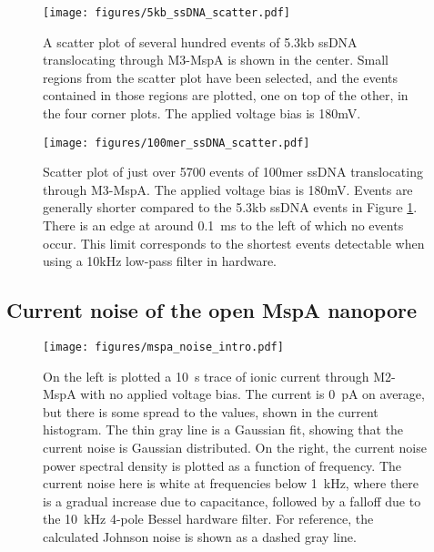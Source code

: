 \begin{figure}[h]
\begin{centering}
\texttt{[image: figures/5kb\_ssDNA\_scatter.pdf]}
\caption[Scatter plot of 5.3kb ssDNA in MspA]{A scatter plot of several hundred events of 5.3kb ssDNA translocating through M3-MspA is shown in the center.  Small regions from the scatter plot have been selected, and the events contained in those regions are plotted, one on top of the other, in the four corner plots.  The applied voltage bias is 180mV.}
\label{fig:mspa_5kb_scatter}
\end{centering}
\end{figure}

\begin{figure}[h]
\begin{centering}
\texttt{[image: figures/100mer\_ssDNA\_scatter.pdf]}
\caption[Scatter plot of 100mer ssDNA in MspA]{Scatter plot of just over 5700 events of 100mer ssDNA translocating through M3-MspA.  The applied voltage bias is 180mV.  Events are generally shorter compared to the 5.3kb ssDNA events in Figure \ref{fig:mspa_5kb_scatter}.  There is an edge at around \SI{0.1}{ms} to the left of which no events occur.  This limit corresponds to the shortest events detectable when using a 10kHz low-pass filter in hardware.}
\label{fig:mspa_100mer_scatter}
\end{centering}
\end{figure}

\subsection{Current noise of the open MspA nanopore}

\begin{figure}[h]
\begin{centering}
\texttt{[image: figures/mspa\_noise\_intro.pdf]}
\caption[Current noise in the MspA nanopore]{On the left is plotted a \SI{10}{\s} trace of ionic current through M2-MspA with no applied voltage bias.  The current is \SI{0}{\pA} on average, but there is some spread to the values, shown in the current histogram.  The thin gray line is a Gaussian fit, showing that the current noise is Gaussian distributed.  On the right, the current noise power spectral density is plotted as a function of frequency.  The current noise here is white at frequencies below \SI{1}{\kHz}, where there is a gradual increase due to capacitance, followed by a falloff due to the \SI{10}{\kHz} 4-pole Bessel hardware filter.  For reference, the calculated Johnson noise is shown as a dashed gray line.}
\label{fig:mspa_noise_intro}
\end{centering}
\end{figure}
